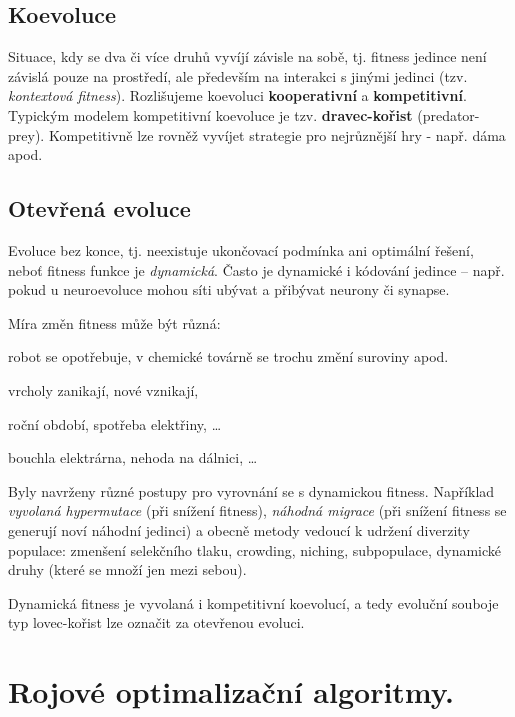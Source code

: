 \subsection{Koevoluce}
Situace, kdy se dva či více druhů vyvíjí závisle na sobě, tj. fitness jedince není závislá pouze na prostředí, ale především na interakci s jinými jedinci (tzv. \textit{kontextová fitness}). Rozlišujeme koevoluci \textbf{kooperativní} a \textbf{kompetitivní}. Typickým modelem kompetitivní koevoluce je tzv. \textbf{dravec-kořist} (predator-prey). Kompetitivně lze rovněž vyvíjet strategie pro nejrůznější hry - např. dáma apod.


\subsection{Otevřená evoluce}
Evoluce bez konce, tj. neexistuje ukončovací podmínka ani optimální řešení, neboť fitness funkce je \textit{dynamická}. Často je dynamické i kódování jedince -- např. pokud u neuroevoluce mohou síti ubývat a přibývat neurony či synapse. 

Míra změn fitness může být různá: 
\begin{description}
	\leftskip 30pt
	
	\item[malé změny] robot se opotřebuje, v chemické továrně se trochu změní suroviny apod.
	\item[výrazné morfologické změny] vrcholy zanikají, nové vznikají, 
	\item[cyklické změny] roční období, spotřeba elektřiny, \dots
	\item[katastrofické změny] bouchla elektrárna, nehoda na dálnici, \dots
\end{description}

Byly navrženy různé postupy pro vyrovnání se s dynamickou fitness. Například \textit{vyvolaná hypermutace} (při snížení fitness), \textit{náhodná migrace} (při snížení fitness se generují noví náhodní jedinci) a obecně metody vedoucí k udržení diverzity populace: zmenšení selekčního tlaku, crowding, niching, subpopulace, dynamické druhy (které se množí jen mezi sebou).

Dynamická fitness je vyvolaná i kompetitivní koevolucí, a tedy evoluční souboje typ lovec-kořist lze označit za otevřenou evoluci.




\section{Rojové optimalizační algoritmy.}
